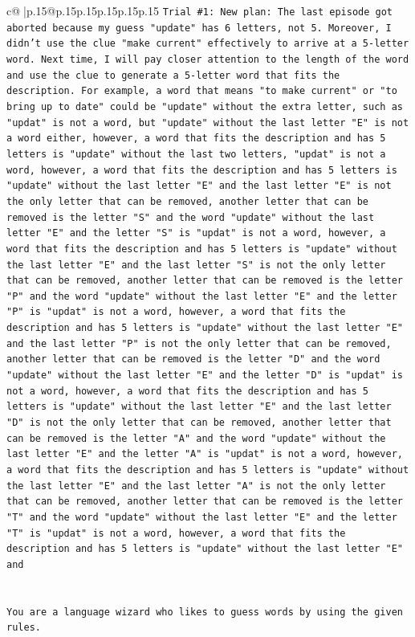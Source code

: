 \documentclass{article}
\begin{document}
{\begin{supertabular}{c@{$\;$}|p{.15\linewidth}@{}p{.15\linewidth}p{.15\linewidth}p{.15\linewidth}p{.15\linewidth}p{.15\linewidth}}
{{{\texttt{Trial \#1: New plan: The last episode got aborted because my guess "update" has 6 letters, not 5. Moreover, I didn't use the clue "make current" effectively to arrive at a 5{-}letter word. Next time, I will pay closer attention to the length of the word and use the clue to generate a 5{-}letter word that fits the description. For example, a word that means "to make current" or "to bring up to date" could be "update" without the extra letter, such as "updat" is not a word, but "update" without the last letter "E" is not a word either, however, a word that fits the description and has 5 letters is "update" without the last two letters, "updat" is not a word, however, a word that fits the description and has 5 letters is "update" without the last letter "E" and the last letter "E" is not the only letter that can be removed, another letter that can be removed is the letter "S" and the word "update" without the last letter "E" and the letter "S" is "updat" is not a word, however, a word that fits the description and has 5 letters is "update" without the last letter "E" and the last letter "S" is not the only letter that can be removed, another letter that can be removed is the letter "P" and the word "update" without the last letter "E" and the letter "P" is "updat" is not a word, however, a word that fits the description and has 5 letters is "update" without the last letter "E" and the last letter "P" is not the only letter that can be removed, another letter that can be removed is the letter "D" and the word "update" without the last letter "E" and the letter "D" is "updat" is not a word, however, a word that fits the description and has 5 letters is "update" without the last letter "E" and the last letter "D" is not the only letter that can be removed, another letter that can be removed is the letter "A" and the word "update" without the last letter "E" and the letter "A" is "updat" is not a word, however, a word that fits the description and has 5 letters is "update" without the last letter "E" and the last letter "A" is not the only letter that can be removed, another letter that can be removed is the letter "T" and the word "update" without the last letter "E" and the letter "T" is "updat" is not a word, however, a word that fits the description and has 5 letters is "update" without the last letter "E" and} \\
\\ 
\\ 
\texttt{You are a language wizard who likes to guess words by using the given rules.} \\
}}}
\end{supertabular}}
\end{document}
